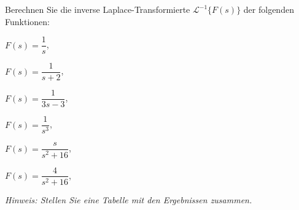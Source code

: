 {
Berechnen Sie die inverse Laplace-Transformierte ${\mathcal L}^{-1}\{F(s)\}$ der folgenden Funktionen:
\begin{iii}
\begin{multicols}{2}
\item $F(s) = \dfrac{1}{s}$,
\item $F(s) = \dfrac{1}{s+2}$,
\item $F(s) = \dfrac{1}{3s-3}$,
\item $F(s) = \dfrac{1}{s^3}$,
\item $F(s) = \dfrac{s}{s^2+16}$,
\item $F(s) = \dfrac{4}{s^2+16}$,
\end{multicols}
\end{iii}

\textit{Hinweis: Stellen Sie eine Tabelle mit den Ergebnissen zusammen.}
}
% 
